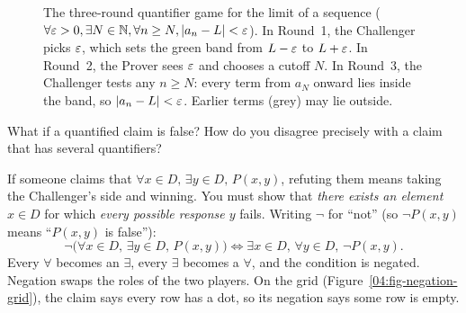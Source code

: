 \begin{figure}[htbp]
\caption{The three-round quantifier game for the limit of a sequence ($\forall \varepsilon > 0, \exists N \in \mathbb{N}, \forall n \ge N, |a_n - L| < \varepsilon$). In Round~1, the Challenger picks $\varepsilon$, which sets the green band from $L - \varepsilon$ to $L + \varepsilon$. In Round~2, the Prover sees $\varepsilon$ and chooses a cutoff $N$. In Round~3, the Challenger tests any $n \ge N$: every term from $a_N$ onward lies inside the band, so $|a_n - L| < \varepsilon$. Earlier terms (grey) may lie outside.}
\label{04:fig-limit-game}
\end{figure}

What if a quantified claim is false? How do you disagree precisely with a claim that has several quantifiers?

If someone claims that $\forall x \in D, \, \exists y \in D, \, P(x, y)$, refuting them means taking the Challenger's side and winning. You must show that \emph{there exists an element $x \in D$} for which \emph{every possible response $y$} fails. Writing $\neg$ for ``not'' (so $\neg P(x, y)$ means ``$P(x, y)$ is false''):
\[
\neg \bigl(\forall x \in D, \, \exists y \in D, \, P(x, y)\bigr) \iff \exists x \in D, \, \forall y \in D, \, \neg P(x, y).
\]
Every $\forall$ becomes an $\exists$, every $\exists$ becomes a $\forall$, and the condition is negated. Negation swaps the roles of the two players. On the grid (Figure~\ref{04:fig-negation-grid}), the claim says every row has a dot, so its negation says some row is empty.

